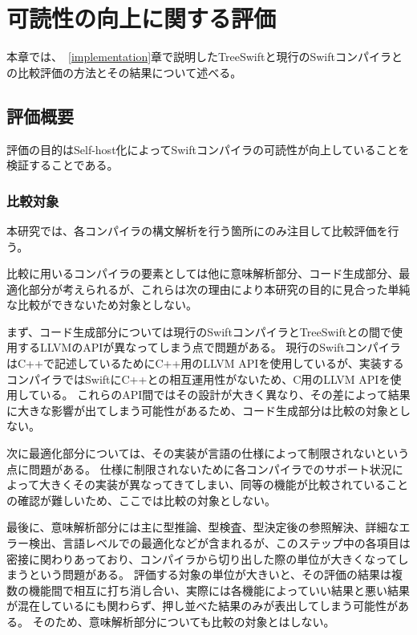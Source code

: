 \chapter{可読性の向上に関する評価}
\label{readability}

本章では、~\ref{implementation}章で説明したTreeSwiftと現行のSwiftコンパイラとの比較評価の方法とその結果について述べる。


\section{評価概要}

評価の目的はSelf-host化によってSwiftコンパイラの可読性が向上していることを検証することである。

\subsection{比較対象}

本研究では、各コンパイラの構文解析を行う箇所にのみ注目して比較評価を行う。

比較に用いるコンパイラの要素としては他に意味解析部分、コード生成部分、最適化部分が考えられるが、これらは次の理由により本研究の目的に見合った単純な比較ができないため対象としない。

まず、コード生成部分については現行のSwiftコンパイラとTreeSwiftとの間で使用するLLVMのAPIが異なってしまう点で問題がある。
現行のSwiftコンパイラはC++で記述しているためにC++用のLLVM APIを使用しているが、実装するコンパイラではSwiftにC++との相互運用性がないため、C用のLLVM APIを使用している。
これらのAPI間ではその設計が大きく異なり、その差によって結果に大きな影響が出てしまう可能性があるため、コード生成部分は比較の対象としない。

次に最適化部分については、その実装が言語の仕様によって制限されないという点に問題がある。
仕様に制限されないために各コンパイラでのサポート状況によって大きくその実装が異なってきてしまい、同等の機能が比較されていることの確認が難しいため、ここでは比較の対象としない。

最後に、意味解析部分には主に型推論、型検査、型決定後の参照解決、詳細なエラー検出、言語レベルでの最適化などが含まれるが、このステップ中の各項目は密接に関わりあっており、コンパイラから切り出した際の単位が大きくなってしまうという問題がある。
評価する対象の単位が大きいと、その評価の結果は複数の機能間で相互に打ち消し合い、実際には各機能によっていい結果と悪い結果が混在しているにも関わらず、押し並べた結果のみが表出してしまう可能性がある。
そのため、意味解析部分についても比較の対象とはしない。


